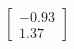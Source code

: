 \documentclass[preview]{standalone}
\begin{document}
\begin{align*}
\begin{bmatrix} -0.93 \\ 1.37 \end{bmatrix}
\end{align*}
\end{document}
